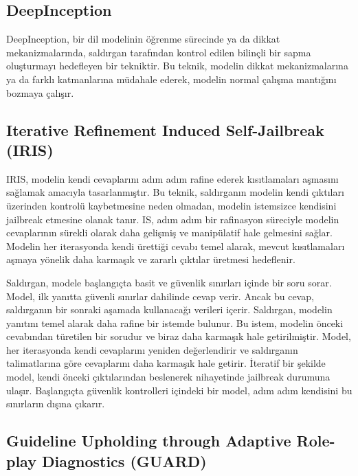 \newpage

\subsection{DeepInception}

DeepInception, bir dil modelinin öğrenme sürecinde ya da dikkat mekanizmalarında, saldırgan tarafından kontrol edilen bilinçli bir sapma oluşturmayı hedefleyen bir tekniktir. Bu teknik, modelin dikkat mekanizmalarına ya da farklı katmanlarına müdahale ederek, modelin normal çalışma mantığını bozmaya çalışır.

\newpage

\subsection{Iterative Refinement Induced Self-Jailbreak (IRIS)}

IRIS, modelin kendi cevaplarını adım adım rafine ederek kısıtlamaları aşmasını sağlamak amacıyla tasarlanmıştır. Bu teknik, saldırganın modelin kendi çıktıları üzerinden kontrolü kaybetmesine neden olmadan, modelin istemsizce kendisini jailbreak etmesine olanak tanır. IS, adım adım bir rafinasyon süreciyle modelin cevaplarının sürekli olarak daha gelişmiş ve manipülatif hale gelmesini sağlar. Modelin her iterasyonda kendi ürettiği cevabı temel alarak, mevcut kısıtlamaları aşmaya yönelik daha karmaşık ve zararlı çıktılar üretmesi hedeflenir. 

Saldırgan, modele başlangıçta basit ve güvenlik sınırları içinde bir soru sorar. Model, ilk yanıtta güvenli sınırlar dahilinde cevap verir. Ancak bu cevap, saldırganın bir sonraki aşamada kullanacağı verileri içerir. Saldırgan, modelin yanıtını temel alarak daha rafine bir istemde bulunur. Bu istem, modelin önceki cevabından türetilen bir sorudur ve biraz daha karmaşık hale getirilmiştir. Model, her iterasyonda kendi cevaplarını yeniden değerlendirir ve saldırganın talimatlarına göre cevaplarını daha karmaşık hale getirir. İteratif bir şekilde model, kendi önceki çıktılarından beslenerek nihayetinde jailbreak durumuna ulaşır. Başlangıçta güvenlik kontrolleri içindeki bir model, adım adım kendisini bu sınırların dışına çıkarır.

\newpage

\subsection{Guideline Upholding through Adaptive Role-play Diagnostics (GUARD)}

